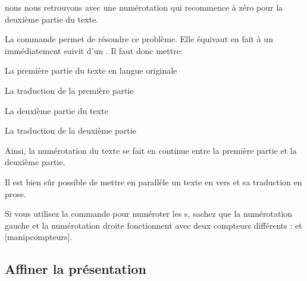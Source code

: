nous nous retrouvons avec une numérotation qui recommence à zéro pour la deuxième partie du texte. 

La commande  permet de résoudre ce problème. Elle équivaut en fait à un  immédiatement suivit d'un . Il faut donc mettre: 

\begin{latexcode}
\begin{pages}  
\begin{Leftside}  \beginnumbering 
La première partie du texte en langue originale
\end{Leftside} %
 
\begin{Rightside} \beginnumbering
La traduction de la première partie
\end{Rightside} %
\Pages
 
\begin{Leftside} \memorydump %
La deuxième partie du texte 
\endnumbering  \end{Leftside}
    
\begin{Rightside}  \memorydump %
La traduction de la deuxième partie
\endnumbering \end{Rightside}   %
 
 \Pages

\end{pages}
\end{latexcode}

Ainsi, la numérotation du texte se fait en continue entre la première partie et la deuxième partie.


\begin{plusloins}
Il est bien sûr possible de mettre en parallèle un texte en vers et sa traduction en prose. 
\end{plusloins}
\begin{plusloins}
Si vous utilisez la commande  pour numéroter les s, sachez que la numérotation gauche et la numérotation droite fonctionnent avec deux compteurs différents :  et [manipcompteurs].
\end{plusloins}




\subsection{Affiner la présentation}


